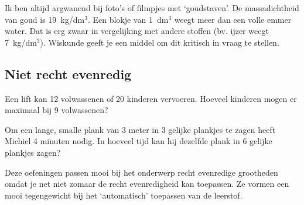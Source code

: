 Ik ben altijd argwanend bij foto's of filmpjes met `goudstaven'. De massadichtheid van goud is 19~kg/dm$^3$. Een blokje van 1~dm$^3$ weegt meer dan  een volle emmer water. Dat is erg zwaar in vergelijking met andere stoffen (bv. ijzer weegt 7~kg/dm$^3$). Wiskunde geeft je een middel om dit kritisch in vraag te stellen.


\subsection{Niet recht evenredig}

\begin{werktekstoef}

\item{Een lift kan 12 volwassenen of 20 kinderen vervoeren. Hoeveel kinderen mogen er maximaal bij 9 volwassenen?}
\item{Om een lange, smalle plank van 3 meter in 3 gelijke plankjes te zagen heeft Michiel 4 minuten nodig. In hoeveel tijd kan hij dezelfde plank in 6 gelijke plankjes zagen?}

\end{werktekstoef}  
\eindewerktekst

Deze oefeningen passen mooi bij het onderwerp recht evenredige grootheden omdat je net niet zomaar de recht evenredigheid kan toepassen. Ze vormen een mooi tegengewicht bij het `automatisch' toepassen van de leerstof.

